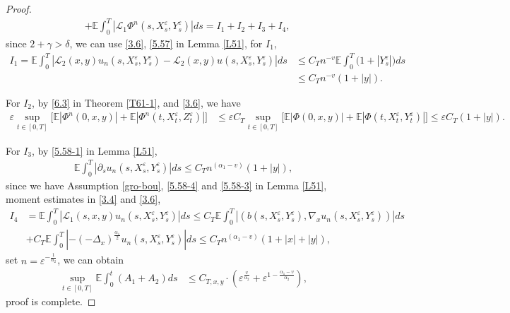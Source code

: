 \documentclass[11pt,reqno]{amsart}
\numberwithin{equation}{section}
\begin{document}
\begin{proof}
\begin{align*}
	&+\mathbb{E}\int_{0}^{T} |\mathcal{L}_{1}\Phi^{n}(s,X_{s}^{\varepsilon},Y_{s}^{\varepsilon})|ds=I_{1}+I_{2}+I_{3}+I_{4},
\end{align*}
since $2+\gamma> \delta$, we can use \eqref{3.6}, \eqref{5.57} in Lemma \ref{L51}, for $I_{1}$, 
\begin{align*}
	I_{1}=\mathbb{E} \int_{0}^{T}\left|\mathcal{L}_{2}(x,y)u_{n}(s,X_{s}^{\varepsilon},Y_{s}^{\varepsilon})-\mathcal{L}_{2}(x,y)u(s,X_{s}^{\varepsilon},Y_{s}^{\varepsilon})\right|ds &\leq C_{T}n^{-v}\mathbb{E}\int_{0}^{T}\big(1+|Y_{s}^{\varepsilon}|\big) ds\\
	&\leq  C_{T}n^{-v}(1+|y|).
\end{align*}

For $I_{2}$, by \eqref{6.3} in Theorem \ref{T61-1}, and \eqref{3.6}, we have 
\begin{align*}
	\varepsilon\sup_{t\in [0,T]}\big[  \mathbb{E}|\Phi^{n}(0,x,y)|+\mathbb{E}|\Phi^{n}(t,X_{t}^{\varepsilon},Z_{t}^{\varepsilon})|\big]  &\leq \varepsilon C_{T}\sup_{t\in [0,T]}\big[  \mathbb{E}|\Phi(0,x,y)|+\mathbb{E}|\Phi(t,X_{t}^{\varepsilon},Y_{t}^{\varepsilon})|\big] \leq \varepsilon C_{T}(1+|y|).
\end{align*}


For $ I_3$, by \eqref{5.58-1} in Lemma \ref{L51},
\begin{align*}
\mathbb{E}\int_{0}^{T}\left|\partial_{s}u_{n}(s,X_{s}^{\varepsilon},Y_{s}^{\varepsilon})\right|ds\leq C_{T}n^{(\alpha_{1}-v)}(1+|y|),
\end{align*}
since we have Assumption \ref{gro-bou}, \eqref{5.58-4} and \eqref{5.58-3} in Lemma \ref{L51}, moment estimates in \eqref{3.4} and \eqref{3.6},
\begin{align*}
I_{4}&=\mathbb{E}\int_{0}^{T}|\mathcal{L}_{1}(s,x,y)u_{n}(s,X_{s}^{\varepsilon},Y_{s}^{\varepsilon})|ds\leq C_{T}  \mathbb{E} \int_{0}^{T}|(b(s,X_{s}^{\varepsilon},Y_{s}^{\varepsilon}),\nabla_{x}u_{n}(s,X_{s}^{\varepsilon},Y_{s}^{\varepsilon}))|ds	\\
&+ C_{T} \mathbb{E}\int_{0}^{T}|-(-\Delta_{x})^{\frac{\alpha_{1}}{2}}u_{n}(s,X_{s}^{\varepsilon},Y_{s}^{\varepsilon})|ds\leq C_{T}n^{(\alpha_{1}-v)}(1+|x|+|y|),
\end{align*}
set $n=\varepsilon^{-\frac{1}{\alpha_{2}}}$, we can obtain
\begin{align*}
\sup_{t\in [0,T]}\mathbb{E}\int_{0}^{t}\left(A_{1}+A_{2}\right)ds&\leq C_{T,x,y}\cdot \left(\varepsilon^{\frac{v}{\alpha_{2}}}+\varepsilon^{1-\frac{\alpha_{1}-v}{\alpha_{2}}}\right),
\end{align*}
proof is complete.
\end{proof}
\end{document}
